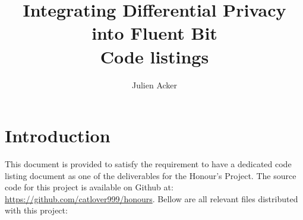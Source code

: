 \documentclass[a4paper]{article}
\title{Integrating Differential Privacy into Fluent Bit \\ \Large Code listings}
\author{Julien Acker}
\begin{document}
\maketitle

\section*{Introduction}

This document is provided to satisfy the requirement to have a dedicated code listing document as one of the deliverables for the Honour's Project. The source code for this project is available on Github at: \url{https://github.com/catlover999/honours}. Bellow are all relevant files distributed with this project:

\lstlistoflistings


\end{document}
